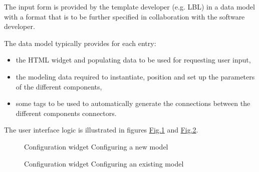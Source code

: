 \documentclass[letterpaper,10pt, openany,english]{sphinxmanual}
\begin{document}
The input form is provided by the template developer (e.g. LBL) in a data model with a format that is to be further specified in collaboration with the software developer.

The data model typically provides for each entry:
\begin{itemize}
\item {} 
the HTML widget and populating data to be used for requesting user input,

\item {} 
the modeling data required to instantiate, position and set up the parameters of the different components,

\item {} 
some tags to be used to automatically generate the connections between the different components connectors.

\end{itemize}

The user interface logic is illustrated in figures \hyperref[\detokenize{requirements:screen-conf-0}]{Fig.\@ \ref{\detokenize{requirements:screen-conf-0}}} and \hyperref[\detokenize{requirements:screen-conf-1}]{Fig.\@ \ref{\detokenize{requirements:screen-conf-1}}}.

\begin{figure}[htbp]
\centering
\capstart

\noindent{}
\caption{Configuration widget \textendash{} Configuring a new model}\label{\detokenize{requirements:screen-conf-0}}\end{figure}

\begin{figure}[htbp]
\centering
\capstart

\noindent{}
\caption{Configuration widget \textendash{} Configuring an existing model}\label{\detokenize{requirements:screen-conf-1}}\end{figure}
\end{document}
